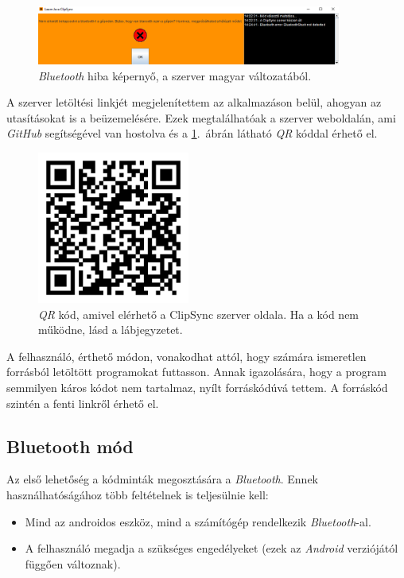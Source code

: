 \documentclass[12pt,a4paper]{article}
\begin{document}
	\begin{figure}[h!]
		\centering
		\includegraphics[width=10cm]{clipsync_server_error}
		\caption{\textit{Bluetooth} hiba képernyő, a szerver magyar változatából.}
	\end{figure}
	
	A szerver letöltési linkjét megjelenítettem az alkalmazáson belül, ahogyan az utasításokat is a beüzemelésére. Ezek megtalálhatóak a szerver weboldalán, ami \textit{GitHub} segítségével van hostolva és a \ref{qr_clipsync}.\ ábrán látható \textit{QR} kóddal érhető el.

	\begin{figure}[h!]
		\centering
		\includegraphics[width=5cm]{clipsync_server_qr}
		\caption[ClipSync szerver caption.]{\textit{QR} kód, amivel elérhető a ClipSync szerver oldala. Ha a kód nem működne, lásd a lábjegyzetet\footnotemark.}
		\label{qr_clipsync}
	\end{figure}

	A felhasználó, érthető módon, vonakodhat attól, hogy számára ismeretlen forrásból letöltött programokat futtasson. Annak igazolására, hogy a program semmilyen káros kódot nem tartalmaz, nyílt forráskódúvá tettem. A forráskód szintén a fenti linkről érhető el.
	
	\subsection{Bluetooth mód}
	
	Az első lehetőség a kódminták megosztására a \textit{Bluetooth}. Ennek használhatóságához több feltételnek is teljesülnie kell:
	
	\begin{itemize}
		\item Mind az androidos eszköz, mind a számítógép rendelkezik \textit{Bluetooth}-al.
		\item A felhasználó megadja a szükséges engedélyeket (ezek az \textit{Android} verziójától függően változnak).
	\end{itemize}
\end{document}
